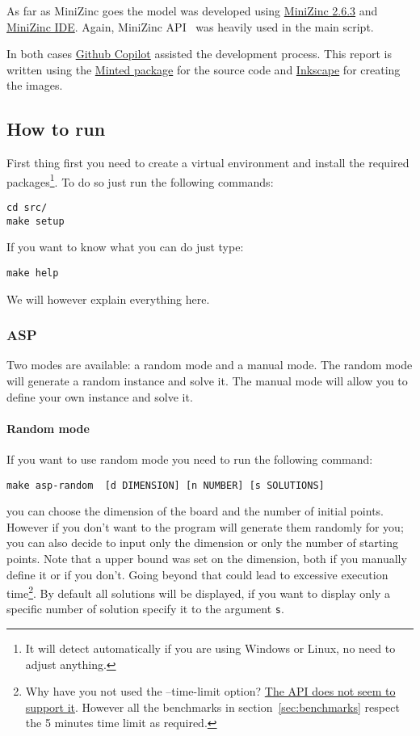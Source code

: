 As far as MiniZinc goes the model was developed using \href{https://github.com/MiniZinc/libminizinc/releases/tag/2.6.3}{MiniZinc 2.6.3} and \href{https://www.minizinc.org/ide/}{MiniZinc IDE}. Again, MiniZinc API~\cite{MiniZincPython} was heavily used in the main script.

In both cases \href{https://copilot.github.com/}{Github Copilot} assisted the development process. This report is written using the \href{https://ctan.org/pkg/minted?lang=en}{Minted package} for the source code and \href{https://inkscape.org/}{Inkscape} for creating the images.


\subsection{How to run}
First thing first you need to create a virtual environment and install the required packages\footnote{It will detect automatically if you are using Windows or Linux, no need to adjust anything.}. To do so just run the following commands:
\begin{verbatim}
cd src/
make setup
\end{verbatim}
If you want to know what you can do just type:

\begin{verbatim}
make help 
\end{verbatim}
We will however explain everything here.

\subsubsection{ASP}
Two modes are available: a random mode and a manual mode. The random mode will generate a random instance and solve it. The manual mode will allow you to define your own instance and solve it.

\paragraph{Random mode}

If you want to use random mode you need to run the following command:
\begin{verbatim}
make asp-random  [d DIMENSION] [n NUMBER] [s SOLUTIONS]
\end{verbatim}

you can choose the dimension of the board and the number of initial points. However if you don't want to the program will generate them randomly for you; you can also decide to input only the dimension or only the number of starting points. Note that a upper bound was set on the dimension, both if you manually define it or if you don't. Going beyond that could lead to excessive execution time\footnote{Why have you not used the --time-limit option? \href{https://github.com/potassco/clingo/issues/151}{The API does not seem to support it}. However all the benchmarks in section~\ref{sec:benchmarks} respect the 5 minutes time limit as required.}.
By default all solutions will be displayed, if you want to display only a specific number of solution specify it to the argument \texttt{s}. 


